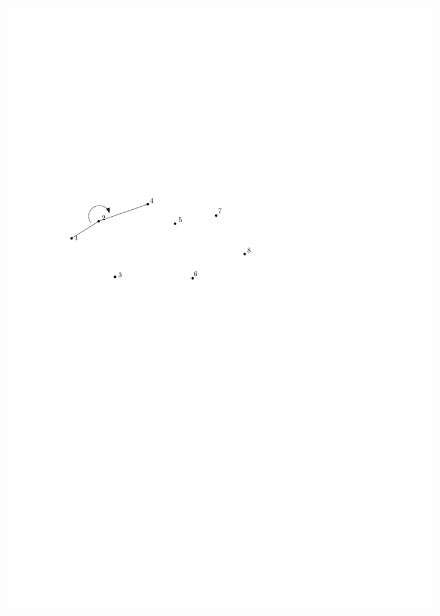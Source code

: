 \begin{frame}
{\begin{figure}[htbp]
\begin{center}
  			\includegraphics[width=.8\linewidth]{bilder/graham4}
			\end{center}
		\end{figure}
	}
\end{frame}
